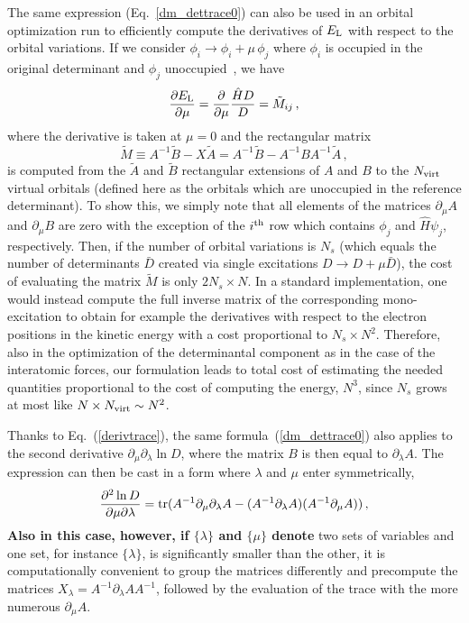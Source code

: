 \documentclass[aip,jcp,reprint,floatfix,onecolumn]{revtex4-1}
\def\wdet{D}
\begin{document}
The same expression (Eq.~\ref{dm_dettrace0}) can also be used in an orbital optimization run to  efficiently compute the derivatives of $E_{\rm L}$ with
respect to the orbital variations. If we consider $\phi_i\to\phi_i+\mu\,\phi_j$ where $\phi_i$ is occupied in the original determinant and $\phi_j$ unoccupied~\cite{opt_orb},  we have
\begin{equation}
\frac{\partial E_{\rm L}}{\partial \mu}  = \frac{\partial}{\partial \mu} \frac{\hat{H}\wdet}{\wdet} = \tilde{M}_{ij}\,,
\label{devmono}
\end{equation}
where the derivative is taken at $\mu = 0$ and the rectangular matrix
\begin{equation}
\tilde{M} \equiv A^{-1} \tilde{B} -X \tilde{A} = A^{-1} \tilde{B} -A^{-1}BA^{-1} \tilde{A} \,,
\label{deftildeM}
\end{equation}
is computed from the $\tilde{A}$ and $\tilde{B}$ rectangular extensions of $A$ and $B$ to the $N_{\rm virt}$ virtual orbitals (defined here as the orbitals which are unoccupied in the reference determinant).
To show this, we simply note that all elements of the matrices $\partial_\mu A$ and $\partial_\mu B$ are zero with
the exception of the $i^{\rm th}$ row which contains $\phi_j$ and $\hat{H}\psi_j$, respectively. Then,
if the number of orbital variations is $N_s$ (which equals the number of determinants $\bar{D}$ created via single excitations $D\to D+\mu\bar{D}$), the cost of evaluating
the matrix $\tilde{M}$ is only $2N_s\times N$. In a standard implementation, one would
instead compute the full inverse matrix of the corresponding mono-excitation to obtain for example the derivatives with respect to the electron positions
in the kinetic energy with a cost proportional to $N_s\times N^2$.
Therefore, also in the optimization of the determinantal component as in the case of the interatomic forces, our formulation leads to total cost of estimating the needed quantities
proportional to the cost of computing the energy, $N^3$, since $N_s$  grows at most like $N\times N_{\rm virt} \sim N^2$.

Thanks to Eq.~(\ref{derivtrace}), the same formula~(\ref{dm_dettrace0}) also applies to the second derivative $\partial_\mu\partial_\lambda \ln D$, where the matrix $B$ is then equal to $\partial_\lambda A$. The expression can then be cast in a form where $\lambda$ and $\mu$ enter symmetrically,
\begin{eqnarray}
\frac{\partial^2  \ln D } {\partial \mu \partial \lambda}
={\rm tr}(A^{-1}\partial_\mu\partial_\lambda A-(A^{-1}\partial_\lambda A)(A^{-1}\partial_\mu A))\,,
\label{2deriv_sym}
\end{eqnarray}
{\bf Also in this case, however, if $\{\lambda\}$ and $\{\mu\}$ denote} two sets of variables and one set, for instance $\{\lambda\}$, is significantly smaller than the other, it is computationally convenient to group the matrices differently and precompute the matrices $X_\lambda =A^{-1}\partial_\lambda A A^{-1}$, followed by the evaluation of the trace with the more numerous $\partial_\mu A$.
\end{document}

